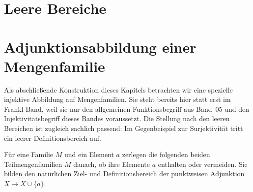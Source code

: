 \documentclass[main.tex]{subfiles}
\begin{document}
\section{Leere Bereiche}

\begin{tabproof}


\end{tabproof}


\section{Adjunktionsabbildung einer Mengenfamilie}

Als abschließende Konstruktion dieses Kapitels betrachten wir eine spezielle
injektive Abbildung auf Mengenfamilien. Sie steht bereits hier statt erst im
Frankl-Band, weil sie nur den allgemeinen Funktionsbegriff aus Band~05 und den
Injektivitätsbegriff dieses Bandes voraussetzt. Die Stellung nach den leeren
Bereichen ist zugleich sachlich passend: Im Gegenbeispiel zur Surjektivität
tritt ein leerer Definitionsbereich auf.

Für eine Familie \(M\) und ein Element \(a\) zerlegen die folgenden beiden
Teilmengenfamilien \(M\) danach, ob ihre Elemente \(a\) enthalten oder
vermeiden. Sie bilden den natürlichen Ziel- und Definitionsbereich der
punktweisen Adjunktion \(X\mapsto X\cup\{a\}\).


\end{document}
